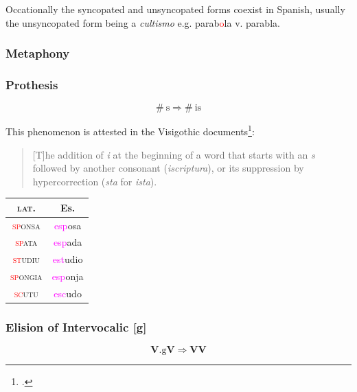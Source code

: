 \documentclass{report}[12pt]
\begin{document}
Occationally the syncopated and unsyncopated forms coexist in Spanish, usually the unsyncopated form being a \emph{cultismo} e.g. parab\textcolor{red}{o}la v. parabla. \\

\subsubsection{Metaphony}

\begin{tcolorbox}

\end{tcolorbox}

\subsubsection{Prothesis}

\begin{tcolorbox}
  \[ \#\ \text{s} \Rightarrow \#\ \text{is} \]
\end{tcolorbox}

This phenomenon is attested in the Visigothic documents\footcite[p.~159]{latin_palaeography}:
\begin{quote}
  [T]he addition of \emph{i} at the beginning of a word that starts with an \emph{s} followed by another consonant (\emph{iscriptura}), or its suppression by hypercorrection (\emph{sta} for \emph{ista}).
\end{quote}

\begin{tabular}{c c}
  \textsc{lat.} & Es. \\
  \hline
  \textsc{\textcolor{red}{sp}onsa} & \textcolor{magenta}{esp}osa \\
  \textsc{\textcolor{red}{sp}ata} & \textcolor{magenta}{esp}ada \\
  \textsc{\textcolor{red}{st}udiu} & \textcolor{magenta}{est}udio \\
  \textsc{\textcolor{red}{sp}ongia} & \textcolor{magenta}{esp}onja \\
  \textsc{\textcolor{red}{sc}utu} & \textcolor{magenta}{esc}udo \\
\end{tabular}

\subsubsection{Elision of Intervocalic [g]}

\begin{tcolorbox}
  \[ \textbf{V}.\text{g}\textbf{V} \Rightarrow \textbf{V}\textbf{V} \]
\end{tcolorbox}
\end{document}
